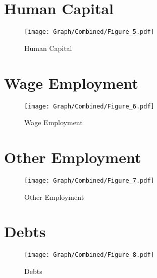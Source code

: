 \documentclass[10pt,a4paper]{article}
\begin{document}
\section{Human Capital}
\begin{table}[H]\centering

\end{table}
\begin{figure}[H]\centering
\texttt{[image: Graph/Combined/Figure\_5.pdf]}
\caption{Human Capital} \label{fig:Fig_5}
\end{figure}
\begin{table}[H]\centering

\end{table}
\pagebreak
\section{Wage Employment}
\begin{table}[H]\centering

\end{table}
\begin{figure}[H]\centering
\texttt{[image: Graph/Combined/Figure\_6.pdf]}
\caption{Wage Employment} \label{fig:Fig_6}
\end{figure}
\begin{table}[H]\centering

\end{table}
\pagebreak
\section{Other Employment}
\begin{table}[H]\centering

\end{table}
\begin{figure}[H]\centering
\texttt{[image: Graph/Combined/Figure\_7.pdf]}
\caption{Other Employment} \label{fig:Fig_7}
\end{figure}
\begin{table}[H]\centering

\end{table}
\pagebreak
\section{Debts}
\begin{table}[H]\centering

\end{table}
\begin{figure}[H]\centering
\texttt{[image: Graph/Combined/Figure\_8.pdf]}
\caption{Debts} \label{fig:Fig_8}
\end{figure}
\begin{table}[H]\centering

\end{table}
\pagebreak
\end{document}
